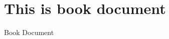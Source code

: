 \documentclass[a4papper, 12pt]{article}
\begin{document}
\chapter{This is book document}
Book Document
\end{document}
